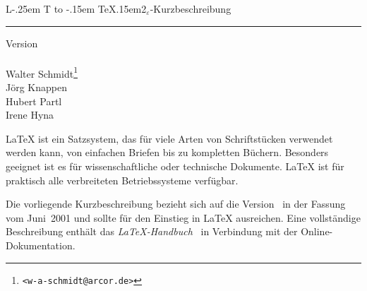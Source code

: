 \documentclass[11pt,a4paper]{article} %
\makeatletter
\DeclareRobustCommand{\sbLaTeXe}{{\fontseries{sbc}\selectfont\boldmath%
        L\kern-.25em%
        {\sbox\z@ T%
         \vbox to\ht\z@{\hbox{\check@mathfonts
                              \fontsize\sf@size\z@
                              \math@fontsfalse\selectfont
                              A}%
                        \vss}%
        }%
        \kern-.15em%
        \TeX\kern.15em2$_{\textstyle\varepsilon}$}}
\newcommand{\manual}{\emph{\LaTeX-Handbuch}~\cite{manual}}
\makeatother
\begin{document}


\nonfrenchspacing      %

\begin{titlepage}
\renewcommand{\thefootnote}{\fnsymbol{footnote}}
{\Huge%
\selectfont
\raggedright
\sbLaTeXe-Kurzbeschreibung
\rule{\textwidth}{0.75pt}
\par
}
\begin{flushleft}
  \normalsize
  \selectfont
  Version \lkver\\
  \lkdate\\[2ex]
  Walter Schmidt\footnote{\texttt{<w-a-schmidt@arcor.de>}}\\
  Jörg Knappen\\
  Hubert Partl%
    \\
  Irene Hyna%
  \\
\end{flushleft}

\vfill

{\parindent=0cm
\LaTeX{} ist ein Satzsystem, das für viele Arten von
Schriftstücken verwendet werden kann, von einfachen Briefen bis zu
kompletten Büchern.  Besonders geeignet ist es für 
wissenschaftliche oder technische Dokumente. \LaTeX{} ist für 
praktisch alle verbreiteten Betriebssysteme verfügbar.
 
Die vorliegende Kurzbeschreibung bezieht sich auf die Version
\LaTeXe\ in der Fassung vom Juni~2001 und sollte für den 
Einstieg in \LaTeX{} ausreichen.  
Eine vollständige Beschreibung enthält das \manual{}
in Verbindung mit der Online-Dokumentation.
}
\setcounter{footnote}{0}
\end{titlepage}
\end{document}

